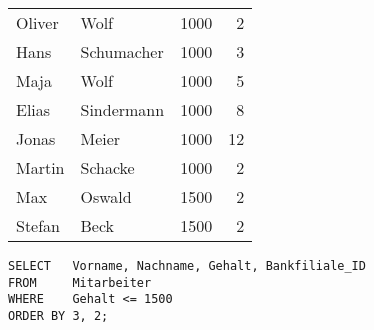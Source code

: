 \begin{center}
    \begin{small}
        \tablehead{}
        \begin{msoraclesql}
            \begin{supertabular}{llrr}
                Oliver & Wolf & 1000 & 2 \\
                Hans & Schumacher & 1000 & 3 \\
                Maja & Wolf & 1000 & 5 \\
                Elias & Sindermann & 1000 & 8 \\
                Jonas & Meier & 1000 & 12 \\
                Martin & Schacke & 1000 & 2 \\
                Max & Oswald & 1500 & 2 \\
                Stefan & Beck & 1500 & 2\\
            \end{supertabular}
        \end{msoraclesql}
    \end{small}
\end{center}
\begin{lstlisting}[language=oracle_sql,caption={Die ORDER BY Klausel mit Positionsangaben},label=sql02_16]
SELECT   Vorname, Nachname, Gehalt, Bankfiliale_ID
FROM     Mitarbeiter
WHERE    Gehalt <= 1500
ORDER BY 3, 2;
        \end{lstlisting}
